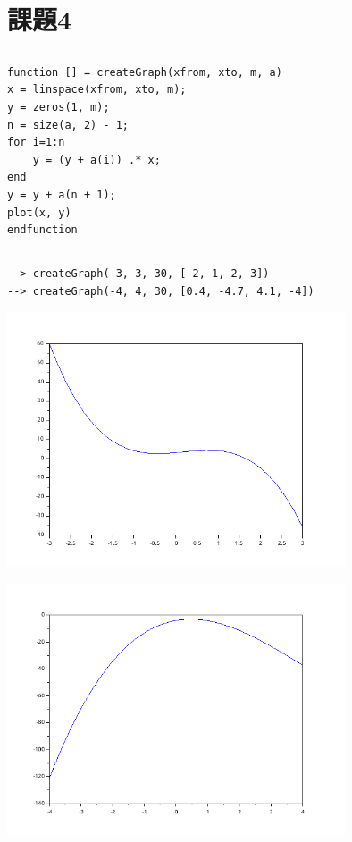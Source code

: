 \documentclass{scrartcl}
\begin{document}
\section{課題4}
\label{sec:org303e02b}
\subsection{}
\label{sec:orgba347ed}
\begin{verbatim}
function [] = createGraph(xfrom, xto, m, a)
x = linspace(xfrom, xto, m);
y = zeros(1, m);
n = size(a, 2) - 1;
for i=1:n
    y = (y + a(i)) .* x;
end
y = y + a(n + 1);
plot(x, y)
endfunction
\end{verbatim}
\subsection{}
\label{sec:org1135d22}
\begin{verbatim}
--> createGraph(-3, 3, 30, [-2, 1, 2, 3])
--> createGraph(-4, 4, 30, [0.4, -4.7, 4.1, -4])
\end{verbatim}
\begin{center}
\includegraphics[width=10cm]{./4-1.png}
\end{center}
\begin{center}
\includegraphics[width=10cm]{./4-2.png}
\end{center}
\end{document}

